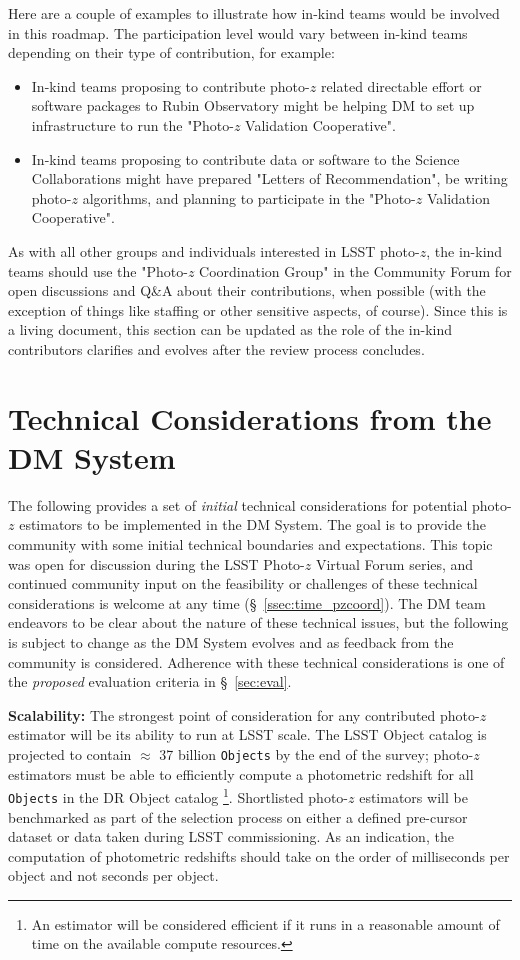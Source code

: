 \documentclass[DM,authoryear,toc]{lsstdoc}
\begin{document}
Here are a couple of examples to illustrate how in-kind teams would be involved in this roadmap.
The participation level would vary between in-kind teams depending on their type of contribution, for example:
\begin{itemize}
\item In-kind teams proposing to contribute photo-$z$ related directable effort or software packages to Rubin Observatory might be helping DM to set up infrastructure to run the "Photo-$z$ Validation Cooperative".
\item In-kind teams proposing to contribute data or software to the Science Collaborations might have prepared "Letters of Recommendation", be writing photo-$z$ algorithms, and planning to participate in the "Photo-$z$ Validation Cooperative".
\end{itemize}

As with all other groups and individuals interested in LSST photo-$z$, the in-kind teams should use the "Photo-$z$ Coordination Group" in the Community Forum for open discussions and Q\&A about their contributions, when possible (with the exception of things like staffing or other sensitive aspects, of course).
Since this is a living document, this section can be updated as the role of the in-kind contributors clarifies and evolves after the review process concludes.


\section{Technical Considerations from the DM System}\label{sec:dmcon}

The following provides a set of {\it initial} technical considerations for potential photo-$z$ estimators to be implemented in the DM System.
The goal is to provide the community with some initial technical boundaries and expectations. 
This topic was open for discussion during the LSST Photo-$z$ Virtual Forum series, and continued community input on the feasibility or challenges of these technical considerations is welcome at any time (\S~\ref{ssec:time_pzcoord}). 
The DM team endeavors to be clear about the nature of these technical issues, but the following is subject to change as the DM System evolves and as feedback from the community is considered. 
Adherence with these technical considerations is one of the {\it proposed} evaluation criteria in \S~\ref{sec:eval}.

\textbf{Scalability:}
The strongest point of consideration for any contributed  photo-$z$ estimator will be its ability to run at LSST scale. 
The LSST Object catalog is projected to contain $\approx$ 37 billion {\tt Objects} by the end of the survey;  photo-$z$ estimators must be able to efficiently compute a photometric redshift for all {\tt Objects} in the DR Object catalog \footnote{An estimator will be considered efficient if it runs in a reasonable amount of time on the available compute resources.}. 
Shortlisted photo-$z$ estimators will be benchmarked as part of the selection process on either a defined pre-cursor dataset or data taken during LSST commissioning.
As an indication, the computation of photometric redshifts should take on the order of milliseconds per object and not seconds per object.
\end{document}
